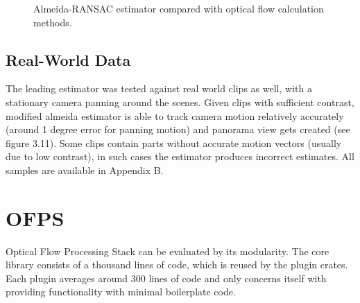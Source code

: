 \documentclass[11pt,english]{report}
\newcommand{\getstat}[1]{docs/statistics/#1}
\newcommand{\vidpic}[1]{
	\texttt{[image: docs/report/\#1]}
}
\newcommand{\statplot}[4]{
	\addplot[#3, mark = #4, thick, smooth, mark size = 2, mark options={fill=#3}] table [y=#2, col sep=comma] {\getstat{#1}};
}
\begin{document}
\begin{figure}[!ht]
\begin{center}
\end{center}
\caption{\centering Almeida-RANSAC estimator compared with optical flow calculation methods.}
\end{figure}

\subsection{Real-World Data}

The leading estimator was tested against real world clips as well, with a stationary camera panning around the scenes. Given clips with sufficient contrast, modified almeida estimator is able to track camera motion relatively accurately (around 1 degree error for panning motion) and panorama view gets created (see figure 3.11). Some clips contain parts without accurate motion vectors (usually due to low contrast), in such cases the estimator produces incorrect estimates. All samples are available in Appendix B.

\section{OFPS}

Optical Flow Processing Stack can be evaluated by its modularity. The core library consists of a thousand lines of code, which is reused by the plugin crates. Each plugin averages around 300 lines of code and only concerns itself with providing functionality with minimal boilerplate code.
\end{document}
